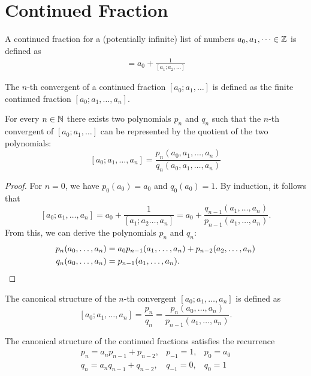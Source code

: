 \section{Continued Fraction}

\begin{definition}
  A continued fraction for a (potentially infinite) list of numbers $a_0, a_1,
  \dots \in {\mathbb Z}$ is defined as
  \begin{align*}
    [a_0; a_1, \dots] = a_0 + \frac{1}{[a_1; a_2, \dots]}
  \end{align*}
\end{definition}

\begin{definition}
  The $n$-th convergent of a continued fraction $[a_0; a_1, \dots]$
  is defined as the finite continued fraction $[a_0; a_1, \dots, a_n]$.
\end{definition}

\begin{lemma}
  For every $n \in {\mathbb N}$ there exists two polynomials $p_n$ and $q_n$ such that the
  $n$-th convergent of $[a_0; a_1, \dots]$ can be represented by the quotient
  of the two polynomials:
  \[
    [a_0; a_1, \dots, a_n] = \frac{p_n(a_0, a_1, \dots, a_n)}{q_n(a_0, a_1, \dots, a_n)}
  \]
\end{lemma}

\begin{proof}
  For $n = 0$, we have $p_0(a_0) = a_0$ and $q_0(a_0) = 1$.
  By induction, it follows that
  \[
    [a_0; a_1, \dots, a_n] = a_0 + \frac{1}{[a_1; a_2 \dots, a_n]} = a_0 + \frac{q_{n-1}(a_1, \dots, a_n)}{p_{n-1}(a_1, \dots, a_n)}.
  \]
  From this, we can derive the polynomials $p_n$ and $q_n$:
  \begin{align*}
    p_n(a_0, \dots, a_n) & = a_0 p_{n-1}(a_1, \dots, a_n) + p_{n-2}(a_2, \dots, a_n) \\
    q_n(a_0, \dots, a_n) & = p_{n-1}(a_1, \dots, a_n). \qedhere
  \end{align*}
\end{proof}

\begin{definition}
  The canonical structure of the $n$-th convergent $[a_0; a_1, \dots, a_n]$ is defined as
  \[
    [a_0; a_1, \dots, a_n] = \frac{p_n}{q_n} = \frac{p_n(a_0, \dots, a_n)}{p_{n-1}(a_1, \dots, a_n)}.
  \]
\end{definition}

\begin{lemma}
  The canonical structure of the continued fractions satisfies the recurrence
  \[
    \begin{matrix}
      p_n = a_n p_{n-1} + p_{n-2}, & p_{-1} = 1, & p_0 = a_0 \\
      q_n = a_n q_{n-1} + q_{n-2}, & q_{-1} = 0, & q_0 = 1
    \end{matrix}
  \]
\end{lemma}

